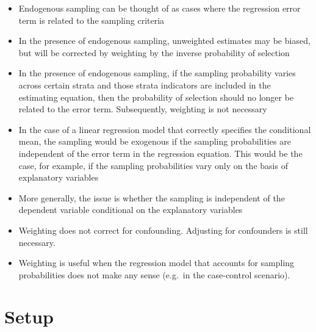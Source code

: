 \documentclass[]{book}
\providecommand{\tightlist}{%
  \setlength{\itemsep}{0pt}\setlength{\parskip}{0pt}}
\theoremstyle{definition}
\theoremstyle{definition}
\theoremstyle{remark}
\begin{document}
\begin{itemize}
\tightlist
\item
  Endogenous sampling can be thought of as cases where the regression
  error term is related to the sampling criteria
  \citep[\citet{solon_what_2013},
  \citet{fuller_sampling_2009}]{friedman_tools_2013}
\item
  In the presence of endogenous sampling, unweighted estimates may be
  biased, but will be corrected by weighting by the inverse probability
  of selection \citep[\citet{solon_what_2013},
  \citet{fuller_sampling_2009}]{friedman_tools_2013}
\item
  In the presence of endogenous sampling, if the sampling probability
  varies across certain strata and those strata indicators are included
  in the estimating equation, then the probability of selection should
  no longer be related to the error term. Subsequently, weighting is not
  necessary \citep[\citet{solon_what_2013},
  \citet{fuller_sampling_2009}]{friedman_tools_2013}
\item
  In the case of a linear regression model that correctly specifies the
  conditional mean, the sampling would be exogenous if the sampling
  probabilities are independent of the error term in the regression
  equation. This would be the case, for example, if the sampling
  probabilities vary only on the basis of explanatory variables
  \citep{solon_what_2013}
\item
  More generally, the issue is whether the sampling is independent of
  the dependent variable conditional on the explanatory variables
  \citep{solon_what_2013}
\item
  Weighting does not correct for confounding. Adjusting for confounders
  is still necessary.
\item
  Weighting is useful when the regression model that accounts for
  sampling probabilities does not make any sense (e.g.~in the
  case-control scenario).
\end{itemize}

\section{Setup}\label{setup}
\end{document}
